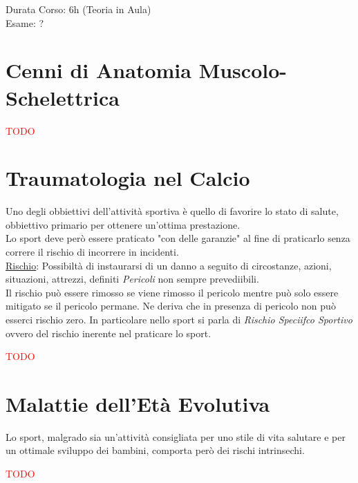 \documentclass[../uefaC.tex]{subfiles}
\begin{document}

Durata Corso: 6h (Teoria in Aula) \hfill \\
Esame: ?

\section{Cenni di Anatomia Muscolo-Schelettrica}
\textcolor{red}{TODO}

\section{Traumatologia nel Calcio}

Uno degli obbiettivi dell'attività sportiva è quello di favorire lo stato di salute, obbiettivo primario per ottenere un'ottima prestazione. \hfill \\
Lo sport deve però essere praticato "con delle garanzie" al fine di praticarlo senza correre il rischio di incorrere in incidenti. \hfill \\
\underline{Rischio}: Possibiltà di instaurarsi di un danno a seguito di circostanze, azioni, situazioni, attrezzi, definiti \emph{Pericoli} non sempre prevediibili. \hfill \\
Il rischio può essere rimosso se viene rimosso il pericolo mentre può solo essere mitigato se il pericolo permane. Ne deriva che in presenza di pericolo non può esserci rischio zero. In particolare nello sport si parla di \emph{Rischio Speciifco Sportivo} ovvero del rischio inerente nel praticare lo sport.

\textcolor{red}{TODO}

\section{Malattie dell'Età Evolutiva}

Lo sport, malgrado sia un'attività consigliata per uno stile di vita salutare e per un ottimale sviluppo dei bambini, comporta però dei rischi intrinsechi.

\textcolor{red}{TODO}
\end{document}
